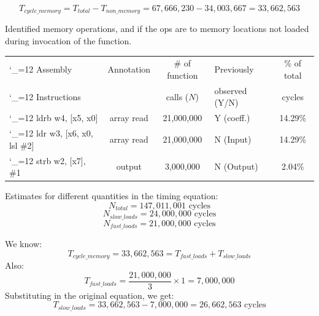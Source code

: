 \documentclass[
  course = {{ESE532 System-on-a-Chip}},
  quartile = {{}},
  assignment = 2,
  name = {{Sheil Sarda}},
  studentnumber = {{}},
  email = {{sheils@seas.upenn.edu}},
  firstexercise = 1
]{aga-homework}
\begin{document}
$$T_{cycle\_memory} = T_{total} - T_{non\_memory}  = 67,666,230 - 34,003,667 = 33,662,563$$

\subexercise 
Identified memory operations, and if the ops are to memory locations not loaded during invocation of the function.
\begin{center}
	\begin{tabular}{|| >{\ttfamily\catcode`_=12 }l | c | c | l | c ||} 
		\hline
		Assembly   & Annotation  & $\#$ of function & Previously  & \% of total\\ [0.5ex] 
		Instructions&         & calls ($N$)  & observed (Y/N) & cycles \\ [0.5ex] 
		\hline\hline
		ldrb    w4, [x5, x0]      &   array read   & 21,000,000 & Y (coeff.) & 14.29\% \\ 
		ldr     w3, [x6, x0, lsl \#2]      &  array read    & 21,000,000 & N (Input) & 14.29\% \\ 
		strb    w2, [x7], \#1      & output  &   3,000,000 & N (Output) & 2.04\% \\     
		\hline
	\end{tabular}
\end{center}
Estimates for different quantities in the timing equation:
$$N_{total} = 147,011,001 \text{ cycles}$$
$$N_{slow\_loads} = 24,000,000 \text{ cycles}$$
$$N_{fast\_loads} = 21,000,000 \text{ cycles}$$
\subexercise

We know:
$$T_{cycle\_memory} = 33,662,563  = T_{fast\_loads} + T_{slow\_loads} $$
Also:
$$T_{fast\_loads} = \frac{21,000,000}{3} \times 1 = 7,000,000 $$
Substituting in the original equation, we get:
$$T_{slow\_loads} = 33,662,563 - 7,000,000 = 26,662,563 \text{ cycles} $$
\end{document}
